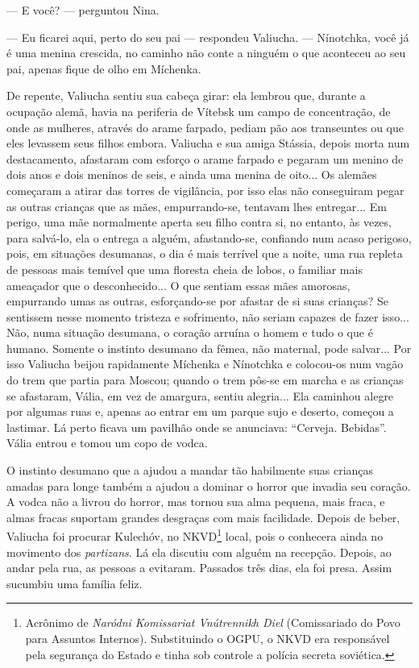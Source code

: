 --- E você? --- perguntou Nina.

--- Eu ficarei aqui, perto do seu pai --- respondeu Valiucha. ---
Nínotchka, você já é uma menina crescida, no caminho não conte a ninguém
o que aconteceu ao seu pai, apenas fique de olho em Míchenka.

De repente, Valiucha sentiu sua cabeça girar: ela lembrou que, durante a
ocupação alemã, havia na periferia de Vítebsk um campo de concentração,
de onde as mulheres, através do arame farpado, pediam pão aos
transeuntes ou que eles levassem seus filhos embora. Valiucha e sua
amiga Stássia, depois morta num destacamento, afastaram com esforço o
arame farpado e pegaram um menino de dois anos e dois meninos de seis, e
ainda uma menina de oito... Os alemães começaram a atirar das torres de
vigilância, por isso elas não conseguiram pegar as outras crianças que
as mães, empurrando-se, tentavam lhes entregar... Em perigo, uma mãe
normalmente aperta seu filho contra si, no entanto, às vezes, para
salvá-lo, ela o entrega a alguém, afastando-se, confiando num acaso
perigoso, pois, em situações desumanas, o dia é mais terrível que a
noite, uma rua repleta de pessoas mais temível que uma floresta cheia de
lobos, o familiar mais ameaçador que o desconhecido... O que sentiam
essas mães amorosas, empurrando umas as outras, esforçando-se por
afastar de si suas crianças? Se sentissem nesse momento tristeza e
sofrimento, não seriam capazes de fazer isso... Não, numa situação
desumana, o coração arruína o homem e tudo o que é humano. Somente o
instinto desumano da fêmea, não maternal, pode salvar... Por isso
Valiucha beijou rapidamente Míchenka e Nínotchka e colocou-os num vagão
do trem que partia para Moscou; quando o trem pôs-se em marcha e as
crianças se afastaram, Vália, em vez de amargura, sentiu alegria... Ela
caminhou alegre por algumas ruas e, apenas ao entrar em um parque sujo e
deserto, começou a lastimar. Lá perto ficava um pavilhão onde se
anunciava: ``Cerveja. Bebidas''. Vália entrou e tomou um copo de vodca.

O instinto desumano que a ajudou a mandar tão habilmente suas crianças
amadas para longe também a ajudou a dominar o horror que invadia seu
coração. A vodca não a livrou do horror, mas tornou sua alma pequena,
mais fraca, e almas fracas suportam grandes desgraças com mais
facilidade. Depois de beber, Valiucha foi procurar Kulechóv, no
NKVD\footnote{Acrônimo de \emph{Naródni Komissariat Vnútrennikh Diel}
  (Comissariado do Povo para Assuntos Internos). Substituindo o OGPU, o
  NKVD era responsável pela segurança do Estado e tinha sob controle a
  polícia secreta soviética.} local, pois o conhecera ainda no movimento
dos \emph{partizans}. Lá ela discutiu com alguém na recepção. Depois, ao
andar pela rua, as pessoas a evitaram. Passados três dias, ela foi
presa. Assim sucumbiu uma família feliz.

